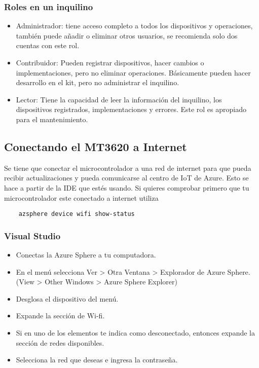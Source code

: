 \subsubsection{Roles en un inquilino}
\begin{itemize}
	\item 
	Administrador: tiene acceso completo a todos los dispositivos y operaciones, también puede añadir o eliminar otros usuarios, se recomienda solo dos cuentas con este rol.
	\item 
	Contribuidor: Pueden registrar dispositivos, hacer cambios o implementaciones, pero no eliminar operaciones. Básicamente pueden hacer desarrollo en el kit, pero no administrar el inquilino.
	\item 
	Lector: Tiene la capacidad de leer la información del inquilino, los dispositivos registrados, implementaciones y errores. Este rol es apropiado para el mantenimiento.
	
\end{itemize}

\subsection{Conectando el MT3620 a Internet}
Se tiene que conectar el microcontrolador a una red de internet para que pueda recibir actualizaciones y pueda comunicarse al centro de IoT de Azure. Esto se hace a partir de la IDE que estés usando.
Si quieres comprobar primero que tu microcontrolador este conectado a internet utiliza

\begin{verbatim}
	azsphere device wifi show-status
\end{verbatim}

\subsubsection{Visual Studio}
\begin{itemize}
	\item
	Conectas la Azure Sphere a tu computadora.
	\item 
	En el menú selecciona Ver > Otra Ventana > Explorador de Azure Sphere.
	(View > Other Windows > Azure Sphere Explorer)
	\item 
	Desglosa el dispositivo del menú. 
	\item 
	Expande la sección de Wi-fi.
	\item 
	Si en uno de los elementos te indica como desconectado, entonces expande la sección de redes disponibles.
	\item 
	Selecciona la red que deseas e ingresa la contraseña.
\end{itemize}

